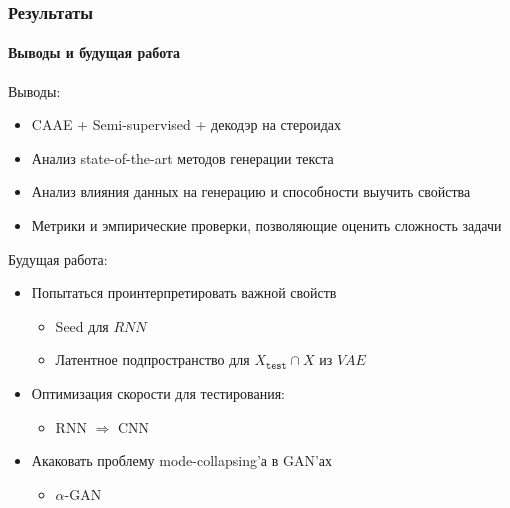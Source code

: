 \documentclass[10pt]{beamer}
\newcommand{\X}[1]{X_{\texttt{#1}}}
\newcommand{\Xtest}{\X{test}}
\begin{document}
\begin{frame}
\frametitle{Результаты}
\framesubtitle{Выводы и будущая работа}

Выводы:
\begin{itemize}
    \item CAAE + Semi-supervised + декодэр на стероидах
    \item Анализ state-of-the-art методов генерации текста
    \item Анализ влияния данных на генерацию и способности выучить свойства
    \item Метрики и эмпирические проверки, позволяющие оценить сложность задачи
\end{itemize}

Будущая работа:
\begin{itemize}
    \item Попытаться проинтерпретировать важной свойств
    \begin{itemize}
        \item Seed для $RNN$
        \item Латентное подпространство для $\Xtest \cap X$ из $VAE$
    \end{itemize}
    \item Оптимизация скорости для тестирования:
    \begin{itemize}
        \item RNN $\Rightarrow$ CNN
    \end{itemize}
    \item Акаковать проблему mode-collapsing'а в GAN'ах
    \begin{itemize}
        \item $\alpha$-GAN
    \end{itemize}
\end{itemize}

\end{frame}
\end{document}
